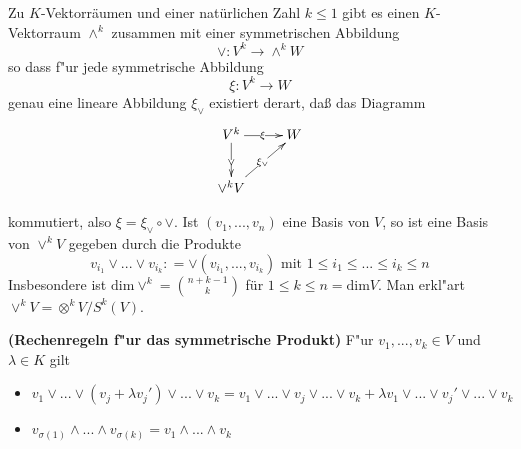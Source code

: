 \documentclass[9pt, a4paper, twocolumn, landscape]{article}
\begin{document}
\begin{theorem}
Zu $K$-Vektorräumen und einer natürlichen Zahl $k \leq 1$ gibt es einen $K$-Vektorraum
$\wedge^k$  zusammen mit einer symmetrischen Abbildung 
$$
\vee: V^k \rightarrow \wedge ^k W
$$
so dass f"ur jede symmetrische Abbildung 
$$
\xi: V^k \rightarrow W
$$
genau eine lineare Abbildung $\xi_{\vee}$ existiert derart, daß das Diagramm 
\begin{gather*}
\xymatrix{V^k   \ar[d]|{\vee} \ar[r]|{\xi} & W\\
\vee^k V \ar[ur]|{\xi_\vee} & }
\end{gather*}

kommutiert, also $\xi = \xi_\vee \circ \vee$. Ist $(v_1,...,v_n)$ eine Basis von $V$, so ist eine Basis von $\vee^k V$ gegeben durch die Produkte 
$$
v_{i_1} \vee ... \vee v_{i_k} : =  \vee (v_{i_1}, ..., v_{i_k}) \text{ mit } 1 \leq i_1 \leq ... \leq  i_k \leq n
$$
Insbesondere ist $\mathrm{dim}\vee^k = \binom{n+k-1}{k}$ für $ 1 \leq k \leq n = \mathrm{dim}V$. 
Man erkl"art \\ $\vee^k V = \otimes^k V / S^k(V)$.
\end{theorem}


\begin{remark}\textbf{(Rechenregeln f"ur das symmetrische Produkt)}
F"ur $v_1, ..., v_k \in V$ und $\lambda \in K$ gilt
\begin{itemize}
\item $v_1 \vee ... \vee (v_j + \lambda v_j') \vee ... \vee v_k = v_1 \vee ... \vee v_j \vee ... \vee v_k + \lambda v_1 \vee ... \vee v_j' \vee ... \vee v_k$
\item $v_{\sigma(1)} \wedge ... \wedge v_{\sigma(k)} = v_1 \wedge ... \wedge v_k$
\end{itemize}
\end{remark}

\end{document}
